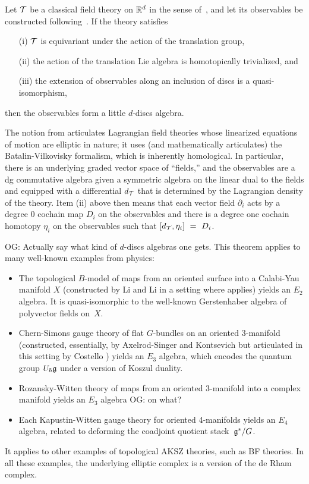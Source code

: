 \documentclass[11pt]{amsart}
\def\owen#1{{\textcolor{violet!65!black}{OG: {#1}}}}
\begin{document}
\begin{thm}[\cite{EllSaf},\owen{precise location}]
Let $\mathcal T$ be a classical field theory on $\mathbb R^d$ in the sense of~\cite{CosBook},
and let its observables be constructed following~\cite{CG2}.
If the theory satisfies 
\begin{enumerate}
\item[(i)] $\mathcal T$ is equivariant under the action of the translation group,
\item[(ii)] the action of the translation Lie algebra is homotopically trivialized, and
\item[(iii)] the extension of observables along an inclusion of discs is a quasi-isomorphism,
\end{enumerate}
then the observables form a little $d$-discs algebra.
\end{thm}

The notion from \cite{CosBook} articulates Lagrangian field theories whose linearized equations of motion are elliptic in nature;
it uses (and mathematically articulates) the Batalin-Vilkovisky formalism,
which is inherently homological.
In particular, there is an underlying graded vector space of ``fields,''
and the observables are a dg commutative algebra given a symmetric algebra on the linear dual to the fields and equipped with a differential $d_\mathcal T$ that is determined by the Lagrangian density of the theory.
Item (ii) above then means that each vector field $\partial_i$ acts by a degree 0 cochain map $D_i$ on the observables and there is a degree one cochain homotopy $\eta_i$ on the observables such that $[d_\mathcal T, \eta_i]~=~D_i$.

\owen{Actually say what kind of $d$-discs algebras one gets.}
This theorem applies to many well-known examples from physics:
\begin{itemize}
\item The topological $B$-model of maps from an oriented surface into a Calabi-Yau manifold $X$ (constructed by Li and Li \cite{LiLi} in a setting where \cite{EllSaf} applies) yields an $E_2$ algebra. It is quasi-isomorphic to the well-known Gerstenhaber algebra of polyvector fields on~$X$.
\item Chern-Simons gauge theory of flat $G$-bundles on an oriented 3-manifold (constructed, essentially, by Axelrod-Singer \cite{AxeSin} and Kontsevich \cite{KonECM} but articulated in this setting by Costello \cite{CosBook}) yields an $E_3$ algebra, which encodes the quantum group $U_\hbar \mathfrak g$ under a version of Koszul duality.
\item Rozansky-Witten theory of maps from an oriented 3-manifold into a complex manifold \cite{ChanLeungLi} yields an $E_3$ algebra \owen{on what?}
\item Each Kapustin-Witten gauge theory for oriented 4-manifolds \cite{EGW} yields an $E_4$ algebra, related to deforming the coadjoint quotient stack~$\mathfrak g^*/G$.
\end{itemize}
It applies to other examples of topological AKSZ theories, such as BF theories.
In all these examples, the underlying elliptic complex is a version of the de Rham complex.
\end{document}
